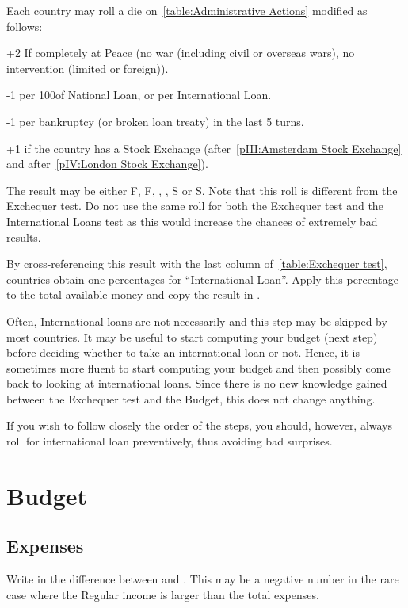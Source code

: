  Each country may roll a die
on~\ref{table:Administrative Actions} modified as follows:
\begin{modlist}
\item[+2] If completely at Peace (no war (including civil or overseas wars),
  no intervention (limited or foreign)).
\item[-1 ] per 100\ducats of National Loan, or per International Loan.
\item[-1 ] per bankruptcy (or broken loan treaty) in the last 5 turns.
\item[+1 ] if the country has a Stock Exchange (\HOL after~\ref{pIII:Amsterdam
    Stock Exchange} and \ANG after~\ref{pIV:London Stock Exchange}).
\end{modlist}
\bparag The result may be either F\textetoile, F, \undemi, \undemi\textetoile,
S or S\textetoile.
\bparag Note that this roll is different from the Exchequer test. Do not use
the same roll for both the Exchequer test and the International Loans test as
this would increase the chances of extremely bad results.

 By cross-referencing this result with the last
column of~\ref{table:Exchequer test}, countries obtain one percentages for
``International Loan''.
\bparag Apply this percentage to the total available money and copy the result
in .

\begin{playtip}
  Often, International loans are not necessarily and this step may be skipped
  by most countries. It may be useful to start computing your budget (next
  step) before deciding whether to take an international loan or not. Hence,
  it is sometimes more fluent to start computing your budget and then possibly
  come back to looking at international loans. Since there is no new knowledge
  gained between the Exchequer test and the Budget, this does not change
  anything.

  If you wish to follow closely the order of the steps, you should, however,
  always roll for international loan preventively, thus avoiding bad
  surprises.
\end{playtip}

\section{Budget}\label{chPeace:Budget}
\subsection{Expenses}
 Write in  the
difference between  and .
\bparag This may be a negative number in the rare case where the Regular
income is larger than the total expenses.

